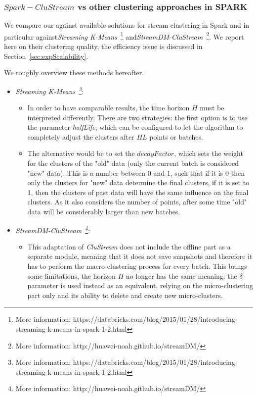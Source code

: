 \subsubsection{$Spark-CluStream$ vs other clustering approaches in SPARK}
\label{sec:expQuality-vs-SPARK}
We compare our \our against available solutions for stream clustering in Spark and in particular against\textit{Streaming K-Means}~\footnote{More information: https://databricks.com/blog/2015/01/28/introducing-streaming-k-means-in-spark-1-2.html} and\textit{StreamDM-CluStream}~\footnote{More information: http://huawei-noah.github.io/streamDM/}.
We report here on their clustering quality, the efficiency issue is discussed in Section~\ref{sec:expScalability}.

We roughly overview these methods hereafter.

\begin{itemize}  \item \textit{Streaming K-Means~\footnote{More information: https://databricks.com/blog/2015/01/28/introducing-streaming-k-means-in-spark-1-2.html}}:
 \begin{itemize}
  \item In order to have comparable results, the time horizon $H$ must be interpreted differently. There are two strategies: the first option is to use the parameter \textit{halfLife}, which can be configured to let the algorithm to completely adjust the clusters after $HL$ points or batches.
  \item The alternative would be to set the $decayFactor$, which sets the weight for the clusters of the "old" data (only the current batch is considered "new" data). This is a number between 0 and 1, such that if it is 0 then only the clusters for "new" data determine the final clusters, if it is set to 1, then the clusters of past data will have the same influence on the final clusters. As it also considers the number of points, after some time "old" data will be considerably larger than new batches.
 \end{itemize}
 \item \textit{StreamDM-CluStream~\footnote{More information: http://huawei-noah.github.io/streamDM/}}:
 \begin{itemize}
  \item This adaptation of \textit{CluStream} does not include the offline part as a separate module, meaning that it does not save snapshots and therefore it has to perform the macro-clustering process for every batch. This brings some limitations, the horizon $H$ no longer has the same meaning: the $\delta$ parameter is used instead as an equivalent, relying on the micro-clustering part only and its ability to delete and create new micro-clusters.
\end{itemize}
\end{itemize}


